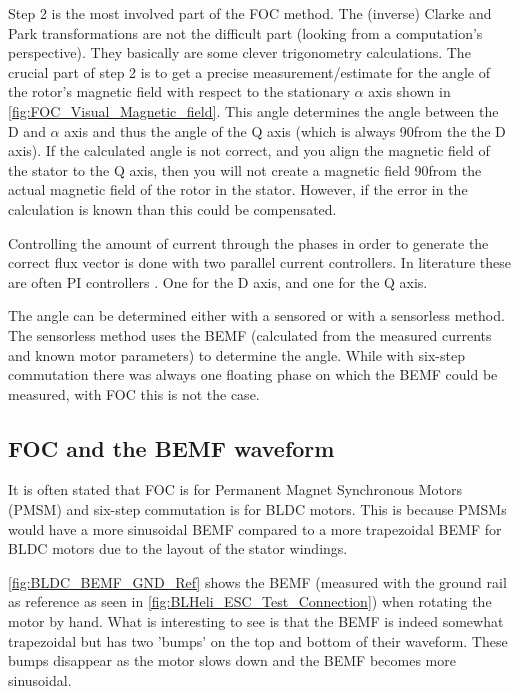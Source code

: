\documentclass[]{report}
\begin{document}
Step 2 is the most involved part of the FOC method. The (inverse) Clarke and Park transformations are not the difficult part (looking from a computation's perspective). They basically are some clever trigonometry calculations. The crucial part of step 2 is to get a precise measurement/estimate for the angle of the rotor's magnetic field with respect to the stationary $\alpha$ axis shown in \autoref{fig:FOC_Visual_Magnetic_field}. This angle determines the angle between the D and $\alpha$ axis and thus the angle of the Q axis (which is always 90\degree from the the D axis). If the calculated angle is not correct, and you align the magnetic field of the stator to the Q axis, then you will not create a magnetic field 90\degree from the actual magnetic field of the rotor in the stator. However, if the error in the calculation is known than this could be compensated.

Controlling the amount of current through the phases in order to generate the correct flux vector is done with two parallel current controllers. In literature these are often PI controllers \cite{Infineon_sensorless_FOC}. One for the D axis, and one for the Q axis.

The angle can be determined either with a sensored or with a sensorless method. The sensorless method \cite{Infineon_sensorless_FOC} uses the BEMF (calculated from the measured currents and known motor parameters) to determine the angle. While with six-step commutation there was always one floating phase on which the BEMF could be measured, with FOC this is not the case.

\subsection{FOC and the BEMF waveform}
It is often stated that FOC is for Permanent Magnet Synchronous Motors (PMSM) and six-step commutation is for BLDC motors. This is because PMSMs would have a more sinusoidal BEMF compared to a more trapezoidal BEMF for BLDC motors due to the layout of the stator windings.

\autoref{fig:BLDC_BEMF_GND_Ref} shows the BEMF (measured with the ground rail as reference as seen in \autoref{fig:BLHeli_ESC_Test_Connection}) when rotating the motor by hand. What is interesting to see is that the BEMF is indeed somewhat trapezoidal but has two 'bumps' on the top and bottom of their waveform. These bumps disappear as the motor slows down and the BEMF becomes more sinusoidal.
\end{document}
